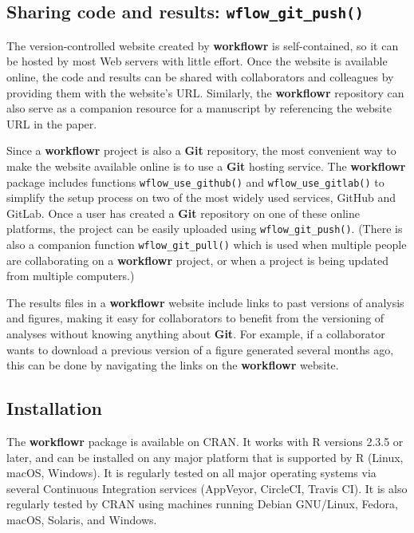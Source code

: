\documentclass[9pt,a4paper]{extarticle}
\begin{document}
\subsection*{Sharing code and results: \texttt{wflow\_git\_push()}}

The version-controlled website created by \textbf{workflowr} is self-contained,
so it can be hosted by most Web servers with little effort. Once the
website is available online, the code and results can be shared with
collaborators and colleagues by providing them with the website's URL.
Similarly, the \textbf{workflowr} repository can also serve as a companion
resource for a manuscript by referencing the website URL in the paper.

Since a \textbf{workflowr} project is also a \textbf{Git} repository, the most convenient
way to make the website available online is to use a \textbf{Git} hosting
service. The \textbf{workflowr} package includes functions \texttt{wflow\_use\_github()} and
\texttt{wflow\_use\_gitlab()} to simplify the setup process on two of the most
widely used services, GitHub and GitLab. Once a user has created a \textbf{Git}
repository on one of these online platforms, the project can be easily
uploaded using \texttt{wflow\_git\_push()}. (There is also a companion function
\texttt{wflow\_git\_pull()} which is used when multiple people are collaborating on
a \textbf{workflowr} project, or when a project is being updated from multiple
computers.)

The results files in a \textbf{workflowr} website include links to past versions
of analysis and figures, making it easy for collaborators to benefit
from the versioning of analyses without knowing anything about \textbf{Git}. For
example, if a collaborator wants to download a previous version of a
figure generated several months ago, this can be done by navigating the
links on the \textbf{workflowr} website.

\subsection*{Installation}

The \textbf{workflowr} package is available on CRAN. It works with R versions
2.3.5 or later, and can be installed on any major platform that is
supported by R (Linux, macOS, Windows). It is regularly tested on all
major operating systems via several Continuous Integration services
(AppVeyor, CircleCI, Travis CI). It is also regularly tested by CRAN
using machines running Debian GNU/Linux, Fedora, macOS, Solaris, and
Windows.
\end{document}
